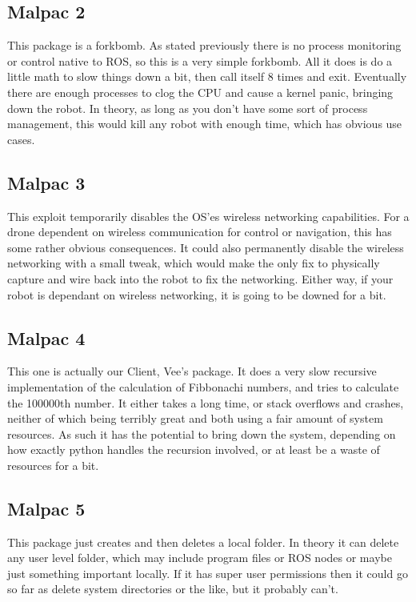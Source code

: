 \documentclass[IEEEtran,letterpaper,10pt,notitlepage,draftclsnofoot,onecolumn]{article}
\begin{document}
\subsection{Malpac 2}
This package is a forkbomb.
As stated previously there is no process monitoring or control native to ROS, so this is a very simple forkbomb. All it does is do a little math to slow things down a bit, then call itself 8 times and exit.
Eventually there are enough processes to clog the CPU and cause a kernel panic, bringing down the robot.
In theory, as long as you don’t have some sort of process management, this would kill any robot with enough time, which has obvious use cases.

\subsection{Malpac 3}
This exploit temporarily disables the OS’es wireless networking capabilities.
For a drone dependent on wireless communication for control or navigation, this has some rather obvious consequences.
It could also permanently disable the wireless networking with a small tweak, which would make the only fix to physically capture and wire back into the robot to fix the networking. Either way, if your robot is dependant on wireless networking,
it is going to be downed for a bit.

\subsection{Malpac 4}
This one is actually our Client, Vee's package. It does a very slow recursive implementation of the calculation of Fibbonachi
numbers, and tries to calculate the 100000th number. It either takes a long time, or stack overflows and crashes, neither 
of which being terribly great and both using a fair amount of system resources. As such it has the potential to bring down
the system, depending on how exactly python handles the recursion involved, or at least be a waste of resources for a bit.

\subsection{Malpac 5}
This package just creates and then deletes a local folder. In theory it can delete any user level folder, which may include
program files or ROS nodes or maybe just something important locally. If it has super user permissions then it could go so
far as delete system directories or the like, but it probably can't.
\end{document}
